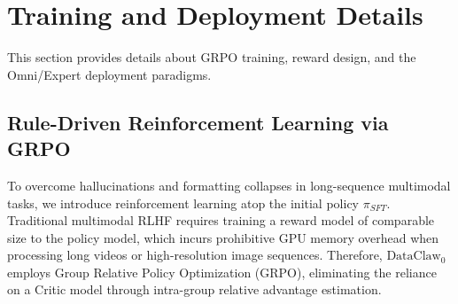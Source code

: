 







\section{Training and Deployment Details}
\label{app:training_details}

This section provides details about GRPO training, reward design, and the Omni/Expert deployment paradigms.


\subsection{Rule-Driven Reinforcement Learning via GRPO}
\label{app:grpo}
To overcome hallucinations and formatting collapses in long-sequence multimodal tasks, we introduce reinforcement learning atop the initial policy \(\pi_{SFT}\). Traditional multimodal RLHF requires training a reward model of comparable size to the policy model, which incurs prohibitive GPU memory overhead when processing long videos or high-resolution image sequences. Therefore, $\text{DataClaw}_0$ employs Group Relative Policy Optimization (GRPO), eliminating the reliance on a Critic model through intra-group relative advantage estimation.

